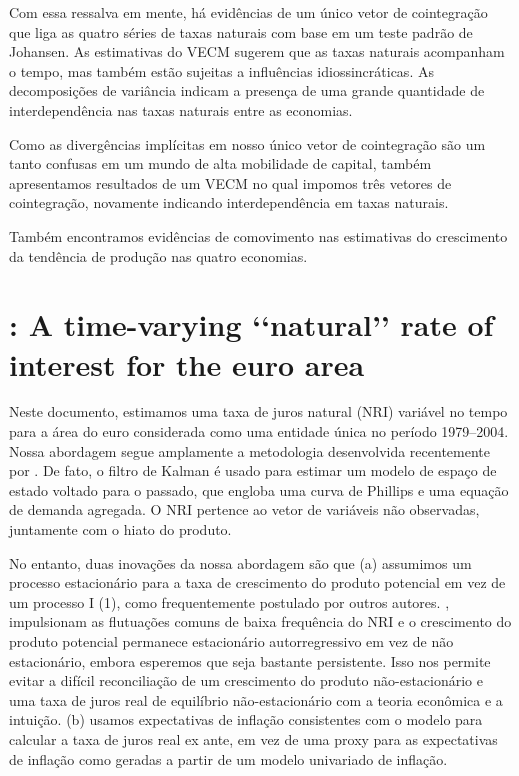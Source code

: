 Com essa ressalva em mente, há evidências de um único vetor de cointegração que liga as quatro séries de taxas naturais com base em um teste padrão de Johansen. As estimativas do VECM sugerem que as taxas naturais acompanham o tempo, mas também estão sujeitas a influências idiossincráticas. As decomposições de variância indicam a presença de uma grande quantidade
de interdependência nas taxas naturais entre as economias.

Como as divergências implícitas em nosso único vetor de cointegração são um tanto confusas em um mundo de alta mobilidade de capital, também apresentamos resultados de um VECM no qual impomos três vetores de cointegração, novamente indicando interdependência em taxas naturais.

Também encontramos evidências de comovimento nas estimativas do crescimento da tendência de produção nas quatro economias.
%
%
\section{\citet{Renne:2007}: A time-varying ‘‘natural’’ rate of interest for the euro area }
Neste documento, estimamos uma taxa de juros natural (NRI) variável no tempo para a área do euro considerada como uma entidade única no período 1979–2004. Nossa abordagem segue amplamente a metodologia desenvolvida recentemente por \citet{LW:2003}. De fato, o filtro de Kalman é usado para estimar um modelo de espaço de estado voltado para o passado, que engloba uma curva de Phillips e uma equação de demanda agregada. O NRI pertence ao vetor de variáveis não observadas, juntamente com o hiato do produto. 

No entanto, duas inovações da nossa abordagem são que (a) assumimos um processo estacionário para a taxa de crescimento do produto potencial em vez de um processo I (1), como frequentemente postulado por outros autores. \citet{LW:2003}, impulsionam as flutuações comuns de baixa frequência do NRI e o crescimento do produto potencial permanece estacionário autorregressivo em vez de não estacionário, embora esperemos que seja bastante persistente. Isso nos permite evitar a difícil reconciliação de um crescimento do produto não-estacionário e uma taxa de juros real de equilíbrio não-estacionário com a teoria econômica e a intuição. (b) usamos expectativas de inflação consistentes com o modelo para calcular a taxa de juros real ex ante, em vez de uma proxy para as expectativas de inflação como geradas a partir de um modelo univariado de inflação.

